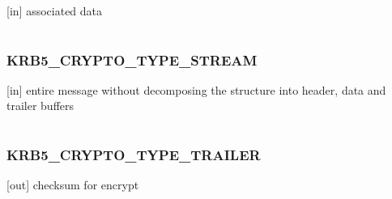 \documentclass[letterpaper,10pt,english]{sphinxmanual}
\begin{document}
{[}in{]} associated data

\begin{tabulary}{\linewidth}{|L|L|}
\hline

 & 
\\
\hline\end{tabulary}



\subsubsection{KRB5\_CRYPTO\_TYPE\_STREAM}
\label{appdev/refs/macros/KRB5_CRYPTO_TYPE_STREAM:krb5-crypto-type-stream-data}\label{appdev/refs/macros/KRB5_CRYPTO_TYPE_STREAM::doc}\label{appdev/refs/macros/KRB5_CRYPTO_TYPE_STREAM:krb5-crypto-type-stream}

\begin{fulllineitems}
\label{appdev/refs/macros/KRB5_CRYPTO_TYPE_STREAM:KRB5_CRYPTO_TYPE_STREAM}
\end{fulllineitems}


{[}in{]} entire message without decomposing the structure into header, data and trailer buffers

\begin{tabulary}{\linewidth}{|L|L|}
\hline

 & 
\\
\hline\end{tabulary}



\subsubsection{KRB5\_CRYPTO\_TYPE\_TRAILER}
\label{appdev/refs/macros/KRB5_CRYPTO_TYPE_TRAILER:krb5-crypto-type-trailer}\label{appdev/refs/macros/KRB5_CRYPTO_TYPE_TRAILER:krb5-crypto-type-trailer-data}\label{appdev/refs/macros/KRB5_CRYPTO_TYPE_TRAILER::doc}

\begin{fulllineitems}
\label{appdev/refs/macros/KRB5_CRYPTO_TYPE_TRAILER:KRB5_CRYPTO_TYPE_TRAILER}
\end{fulllineitems}


{[}out{]} checksum for encrypt
\end{document}
